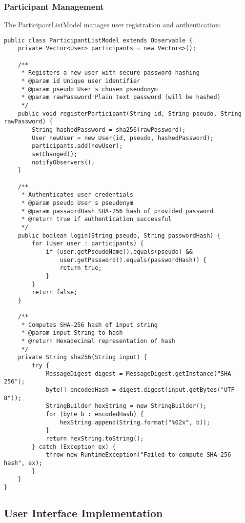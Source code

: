 \documentclass[12pt,a4paper]{article}
\begin{document}
\subsubsection{Participant Management}

The ParticipantListModel manages user registration and authentication:

\begin{lstlisting}[caption=Secure User Management Implementation]
public class ParticipantListModel extends Observable {
    private Vector<User> participants = new Vector<>();

    /**
     * Registers a new user with secure password hashing
     * @param id Unique user identifier
     * @param pseudo User's chosen pseudonym
     * @param rawPassword Plain text password (will be hashed)
     */
    public void registerParticipant(String id, String pseudo, String rawPassword) {
        String hashedPassword = sha256(rawPassword);
        User newUser = new User(id, pseudo, hashedPassword);
        participants.add(newUser);
        setChanged();
        notifyObservers();
    }

    /**
     * Authenticates user credentials
     * @param pseudo User's pseudonym
     * @param passwordHash SHA-256 hash of provided password
     * @return true if authentication successful
     */
    public boolean login(String pseudo, String passwordHash) {
        for (User user : participants) {
            if (user.getPseudoName().equals(pseudo) &&
                user.getPassword().equals(passwordHash)) {
                return true;
            }
        }
        return false;
    }

    /**
     * Computes SHA-256 hash of input string
     * @param input String to hash
     * @return Hexadecimal representation of hash
     */
    private String sha256(String input) {
        try {
            MessageDigest digest = MessageDigest.getInstance("SHA-256");
            byte[] encodedHash = digest.digest(input.getBytes("UTF-8"));
            StringBuilder hexString = new StringBuilder();
            for (byte b : encodedHash) {
                hexString.append(String.format("%02x", b));
            }
            return hexString.toString();
        } catch (Exception ex) {
            throw new RuntimeException("Failed to compute SHA-256 hash", ex);
        }
    }
}
\end{lstlisting}

\subsection{User Interface Implementation}
\end{document}
